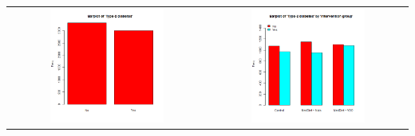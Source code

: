 \documentclass{article}
\begin{document}
\begin{center}
\begin{tabular}{cc}
\includegraphics[width=0.6\textwidth]{example2a.png} & \includegraphics[width=0.6\textwidth]{example2b.png} \\

\end{tabular}
\end{center}
\end{document}
